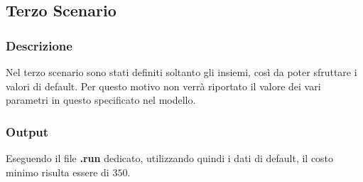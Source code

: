 \subsection{Terzo Scenario}
\subsubsection{Descrizione}
Nel terzo scenario sono stati definiti soltanto gli insiemi, così da poter sfruttare i valori di default. Per questo motivo non verrà riportato il valore dei vari parametri in questo specificato nel modello.
\subsubsection{Output}
Eseguendo il file \textbf{.run} dedicato, utilizzando quindi i dati di default, il costo minimo risulta essere di \texteuro$350$.